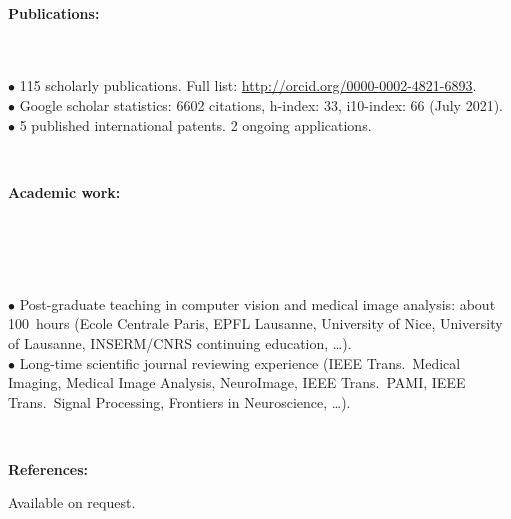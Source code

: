 \documentclass[english,10pt,a4paper]{scrartcl}
\begin{document}
\ \\
\noindent 
\begin{minipage}{.15\textwidth}
\textbf{Publications:}
\ \\ 
\ \\
\ \\
\end{minipage}
\begin{minipage}{.85\textwidth}
{\tiny$\bullet$} 115 scholarly publications. Full list: \url{http://orcid.org/0000-0002-4821-6893}. \\
{\tiny$\bullet$} Google scholar statistics: 6602 citations, h-index: 33, i10-index: 66 (July 2021).\\
{\tiny$\bullet$} 5 published international patents. 2 ongoing applications.\\
\end{minipage}



\ \\
\noindent 
\begin{minipage}{.15\textwidth}
\textbf{Academic work:}
\ \\ 
\ \\
\ \\
\ \\
\ \\
\end{minipage}
\begin{minipage}{.85\textwidth}
  {\tiny$\bullet$} Post-graduate teaching in computer vision and medical image analysis: about 100~hours (Ecole Centrale Paris, EPFL Lausanne, University of Nice, University of Lausanne, INSERM/CNRS continuing education, \ldots).\ \\
  {\tiny$\bullet$} Long-time scientific journal reviewing experience (IEEE Trans.~Medical Imaging, Medical Image Analysis, NeuroImage, IEEE Trans.~PAMI, IEEE Trans.~Signal Processing, Frontiers in Neuroscience, \ldots).\ \\  
\end{minipage}


\ \\
\noindent 
\begin{minipage}{.15\textwidth}
\textbf{References:}
\end{minipage}
\begin{minipage}{.85\textwidth}
Available on request.
\end{minipage}

%
\end{document}
